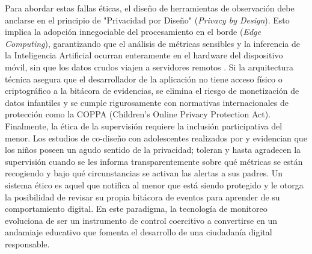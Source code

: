 Para abordar estas fallas éticas, el diseño de herramientas de observación debe anclarse en el principio de "Privacidad por Diseño" (\textit{Privacy by Design}). Esto implica la adopción innegociable del procesamiento en el borde (\textit{Edge Computing}), garantizando que el análisis de métricas sensibles y la inferencia de la Inteligencia Artificial ocurran enteramente en el hardware del dispositivo móvil, sin que los datos crudos viajen a servidores remotos \cite{ali_getting_2023}. Si la arquitectura técnica asegura que el desarrollador de la aplicación no tiene acceso físico o criptográfico a la bitácora de evidencias, se elimina el riesgo de monetización de datos infantiles y se cumple rigurosamente con normativas internacionales de protección como la COPPA (Children's Online Privacy Protection Act).\\

Finalmente, la ética de la supervisión requiere la inclusión participativa del menor. Los estudios de co-diseño con adolescentes realizados por \cite{dumaru_its_2024} y \cite{mcnally_co-designing_2018} evidencian que los niños poseen un agudo sentido de la privacidad; toleran y hasta agradecen la supervisión cuando se les informa transparentemente sobre qué métricas se están recogiendo y bajo qué circunstancias se activan las alertas a sus padres. Un sistema ético es aquel que notifica al menor que está siendo protegido y le otorga la posibilidad de revisar su propia bitácora de eventos para aprender de su comportamiento digital. En este paradigma, la tecnología de monitoreo evoluciona de ser un instrumento de control coercitivo a convertirse en un andamiaje educativo que fomenta el desarrollo de una ciudadanía digital responsable.